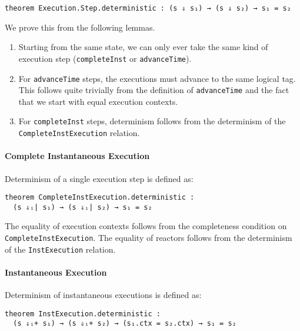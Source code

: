\begin{lstlisting}
theorem Execution.Step.deterministic : (s ⇓ s₁) → (s ⇓ s₂) → s₁ = s₂
\end{lstlisting}

We prove this from the following lemmas. 

\begin{enumerate}
  \item Starting from the same state, we can only ever take the same kind of execution step (\lstinline{completeInst} or \lstinline{advanceTime}).
  \item For \lstinline{advanceTime} steps, the executions must advance to the same logical tag. 
        This follows quite trivially from the definition of \lstinline{advanceTime} and the fact that we start with equal execution contexts.
  \item For \lstinline{completeInst} steps, determinism follows from the determinism of the \lstinline{CompleteInstExecution} relation.
\end{enumerate}

\paragraph{Complete Instantaneous Execution}

Determinism of a single execution step is defined as:

\begin{lstlisting}
theorem CompleteInstExecution.deterministic : 
  (s ⇓ᵢ| s₁) → (s ⇓ᵢ| s₂) → s₁ = s₂
\end{lstlisting}

The equality of execution contexts follows from the completeness condition on \lstinline{CompleteInstExecution}.
The equality of reactors follows from the determinism of the \lstinline{InstExecution} relation.

\paragraph{Instantaneous Execution}

Determinism of instantaneous executions is defined as:

\begin{lstlisting}
theorem InstExecution.deterministic : 
  (s ⇓ᵢ+ s₁) → (s ⇓ᵢ+ s₂) → (s₁.ctx = s₂.ctx) → s₁ = s₂
\end{lstlisting}